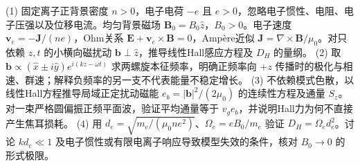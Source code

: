 (1) 固定离子正背景密度 \(n>0\)，电子电荷 \(-e\) 且 \(e>0\)，忽略电子惯性、电阻、电子压强以及位移电流。均匀背景磁场 \(\boldsymbol B_0=B_0\hat z\)，\(B_0>0\)。电子速度 \(\boldsymbol v_e=-\boldsymbol J/(ne)\)，Ohm关系 \(\boldsymbol E+\boldsymbol v_e\times\boldsymbol B=0\)，Ampère近似 \(\boldsymbol J=\nabla\times\boldsymbol B/\mu_0\)。对只依赖 \(z,t\) 的小横向磁扰动 \(\boldsymbol b\perp\hat z\)，推导线性Hall感应方程及 \(D_H\) 的量纲。
(2) 取 \(\boldsymbol b\propto(\hat x\pm i\hat y)e^{i(kz-\omega t)}\) 求两螺旋本征频率，明确正频率向 \(+z\) 传播时的极化与相速、群速；解释负频率的另一支不代表能量不稳定增长。
(3) 不依赖模式色散，以线性Hall方程推导局域正定扰动磁能 \(e_b=|\boldsymbol b|^2/(2\mu_0)\) 的连续性方程及通量 \(S_z\)。对一束严格圆偏振正频平面波，验证平均通量等于 \(v_ge_b\)，并说明Hall力为何不直接产生焦耳损耗。
(4) 用 \(d_e=\sqrt{m_e/(\mu_0ne^2)}\)、\(\Omega_e=eB_0/m_e\) 验证 \(D_H=\Omega_ed_e^2\)。讨论 \(k d_e\ll1\) 及电子惯性或有限电离子响应导致模型失效的条件，核对 \(B_0\to0\) 的形式极限。
